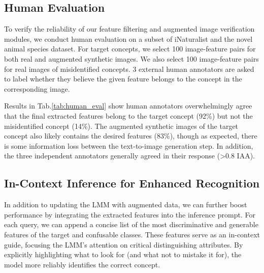 \subsection{Human Evaluation} 
\label{sec:human_eval}



To verify the reliability of our feature filtering and augmented image verification modules, we conduct human evaluation on a subset of iNaturalist and the novel animal species dataset. For target concepts, we select 100 image-feature pairs for both real and augmented synthetic images. We also select 100 image-feature pairs for real images of misidentified concepts. 3 external human annotators are asked to label whether they believe the given feature belongs to the concept in the corresponding image.


Results in Tab.\ref{tab:human_eval} show human annotators overwhelmingly agree that the final extracted features belong to the target concept (92\%) but not the misidentified concept (14\%). The augmented synthetic images of the target concept also likely contains the desired features (83\%), though as expected, there is some information loss between the text-to-image generation step. In addition, the three independent annotators generally agreed in their response (\textgreater 0.8 IAA).



\subsection{In-Context Inference for Enhanced Recognition}
In addition to updating the LMM with augmented data, we can further boost performance by integrating the extracted features into the inference prompt. For each query, we can append a concise list of the most discriminative and generable features of the target and confusable classes. These features serve as an in-context guide, focusing the LMM’s attention on critical distinguishing attributes. By explicitly highlighting what to look for (and what not to mistake it for), the model more reliably identifies the correct concept.









